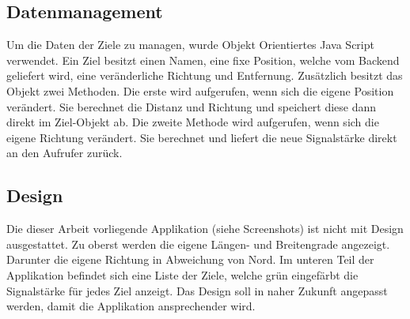\subsection{Datenmanagement} %
\label{sub:datenmanagement}
Um die Daten der Ziele zu managen, wurde Objekt Orientiertes Java Script verwendet. Ein Ziel besitzt einen Namen, eine fixe Position, welche vom Backend geliefert wird, eine veränderliche Richtung und Entfernung. Zusätzlich besitzt das Objekt zwei Methoden. Die erste wird aufgerufen, wenn sich die eigene Position verändert. Sie berechnet die Distanz und Richtung und speichert diese dann direkt im Ziel-Objekt ab. Die zweite Methode wird aufgerufen, wenn sich die eigene Richtung verändert. Sie berechnet und liefert die neue Signalstärke direkt an den Aufrufer zurück. 

\subsection{Design} %
\label{sub:design}
Die dieser Arbeit vorliegende Applikation (siehe Screenshots) ist nicht mit Design ausgestattet. Zu oberst werden die eigene Längen- und Breitengrade angezeigt. Darunter die eigene Richtung in Abweichung von Nord. 
Im unteren Teil der Applikation befindet sich eine Liste der Ziele, welche grün eingefärbt die Signalstärke für jedes Ziel anzeigt. Das Design soll in naher Zukunft angepasst werden, damit die Applikation ansprechender wird.

